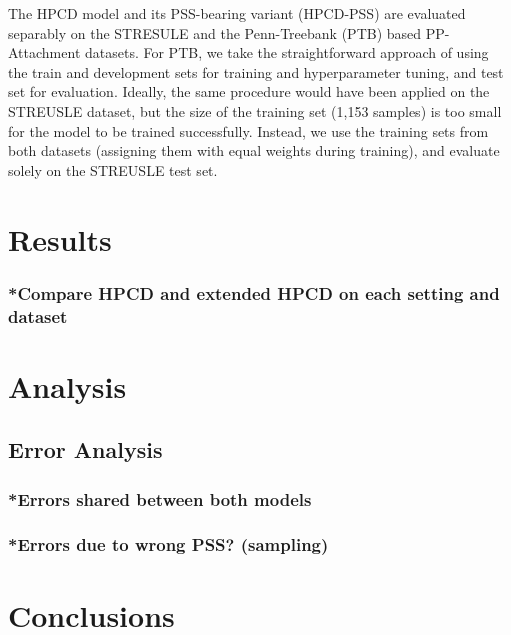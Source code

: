 The HPCD model and its PSS-bearing variant (HPCD-PSS) are evaluated separably on the STRESULE and the Penn-Treebank (PTB) based PP-Attachment datasets. For PTB, we take the straightforward approach of using the train and development sets for training and hyperparameter tuning, and test set for evaluation. Ideally, the same procedure would have been applied on the STREUSLE dataset, but the size of the training set (1,153 samples) is too small for the model to be trained successfully. Instead, we use the training sets from both datasets (assigning them with equal weights during training), and evaluate solely on the STREUSLE test set. 

\section{Results}
\subsubsection{*Compare HPCD and extended HPCD on each setting and dataset}

\section{Analysis}
\subsection{Error Analysis}
\subsubsection{*Errors shared between both models}
\subsubsection{*Errors due to wrong PSS? (sampling)}

\section{Conclusions}
